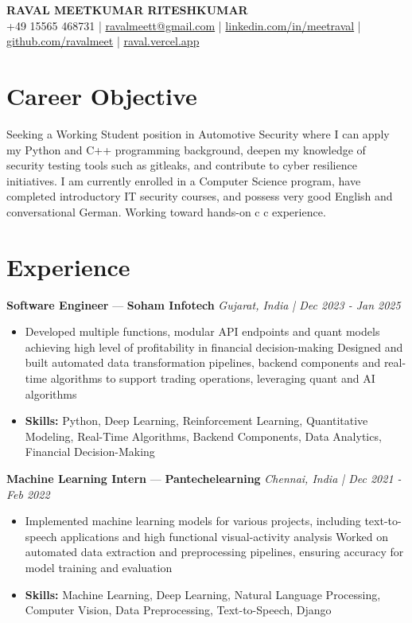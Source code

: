 \documentclass[a4paper,10pt]{article}
\begin{document}
\begin{center}
  {\Large\bfseries RAVAL MEETKUMAR RITESHKUMAR}\\[2pt]
  {\small +49 15565 468731 \;|\; \href{mailto:ravalmeett@gmail.com}{ravalmeett@gmail.com} \;|\; \href{https://www.linkedin.com/in/meetraval/}{linkedin.com/in/meetraval} \;|\; \href{https://github.com/ravalmeet}{github.com/ravalmeet} \;|\; \href{https://raval.vercel.app/}{raval.vercel.app}}
\end{center}
\vspace{-3pt}

\section*{Career Objective}
Seeking a Working Student position in Automotive Security where I can apply my Python and C++ programming background, deepen my knowledge of security testing tools such as gitleaks, and contribute to cyber resilience initiatives. I am currently enrolled in a Computer Science program, have completed introductory IT security courses, and possess very good English and conversational German. Working toward hands-on c c experience.\par

\section*{Experience}
\textbf{Software Engineer} — \textbf{Soham Infotech} \hfill \textit{Gujarat, India \;|\; Dec 2023 - Jan 2025}\par
\vspace{1pt}
\begin{itemize}
  \item Developed multiple functions, modular API endpoints and quant models achieving high level of profitability in financial decision-making Designed and built automated data transformation pipelines, backend components and real-time algorithms to support trading operations, leveraging quant and AI algorithms
  \item \textbf{Skills:} Python, Deep Learning, Reinforcement Learning, Quantitative Modeling, Real-Time Algorithms, Backend Components, Data Analytics, Financial Decision-Making
\end{itemize}
\vspace{3pt}
\textbf{Machine Learning Intern} — \textbf{Pantechelearning} \hfill \textit{Chennai, India \;|\; Dec 2021 - Feb 2022}\par
\vspace{1pt}
\begin{itemize}
  \item Implemented machine learning models for various projects, including text-to-speech applications and high functional visual-activity analysis Worked on automated data extraction and preprocessing pipelines, ensuring accuracy for model training and evaluation
  \item \textbf{Skills:} Machine Learning, Deep Learning, Natural Language Processing, Computer Vision, Data Preprocessing, Text-to-Speech, Django
\end{itemize}
\end{document}
